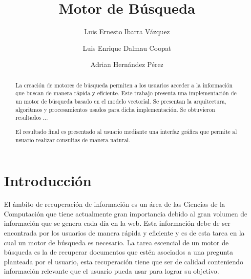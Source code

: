 \documentclass[runningheads]{llncs}
\begin{document}
%
\title{Motor de Búsqueda}
%
%
\author{Luis Ernesto Ibarra Vázquez \and
Luis Enrique Dalmau Coopat \and
Adrian Hernández Pérez}
%
%
%
\maketitle              %
%
\begin{abstract}
La creación de motores de búsqueda permiten a los usuarios acceder a la información
que buscan de manera rápida y eficiente. Este trabajo presenta una implementación de 
un motor de búsqueda basado en el modelo vectorial. Se presentan la arquitectura,
algoritmos y procesamientos usados para dicha implementación. Se obtuvieron resultados ...

El resultado final es presentado al usuario mediante una interfaz gráfica que permite
al usuario realizar consultas de manera natural.

\end{abstract}

\section{Introducción}

El ámbito de recuperación de información es un área de las Ciencias de la Computación que tiene
actualmente gran importancia debido al gran volumen de información que se genera cada día en la
web. Esta información debe de ser encontrada por los usuarios de manera rápida y eficiente y es
de esta tarea en la cual un motor de búsqueda es necesario. La tarea escencial de un motor de
búsqueda es la de recuperar documentos que estén asociados a una pregunta planteada por el usuario, 
esta recuperación tiene que ser de calidad conteniendo información relevante que el usuario pueda
usar para lograr su objetivo.
\end{document}
